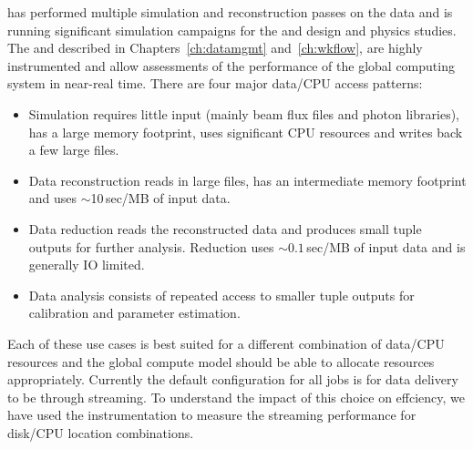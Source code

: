\documentclass[../main-v1.tex]{subfiles}
\begin{document}
 has performed multiple simulation and reconstruction passes on the  data and is running significant simulation campaigns for the  and  design and physics studies. The  and  described in Chapters~\ref{ch:datamgmt} and~\ref{ch:wkflow}, are highly instrumented and allow assessments of the performance of the global computing system in near-real time.  There are four major data/CPU access patterns:
\begin{itemize}
    \item Simulation requires little input (mainly beam flux files and photon libraries),  has a large memory footprint, uses significant CPU resources and writes back a few large files.
    \item Data reconstruction reads in large files, has an intermediate memory footprint and uses $\sim$10\,sec/MB of input data.  
    \item Data reduction reads the reconstructed data and produces small tuple outputs for further analysis.  Reduction uses $\sim0.1$\,sec/MB of input data and is generally IO limited.
    \item Data analysis consists of repeated access to smaller tuple outputs for calibration and parameter estimation.
\end{itemize}

Each of these use cases is best suited for a different combination of data/CPU resources and the global compute model should be able to allocate resources appropriately.  Currently the default configuration for all  jobs is for data delivery to be through  streaming. To understand the impact of this choice on effciency, we have used the  instrumentation to measure the  streaming performance for disk/CPU location combinations. 
\end{document}
